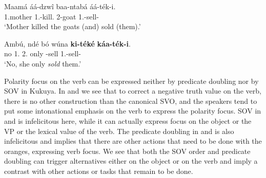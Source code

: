 \documentclass[output=paper,colorlinks,citecolor=brown,
]{langscibook}
\begin{document}
\begin{exe}
    \ex \label{57}
    \begin{xlist}
\ex
\label{57a}
\gll
Maamá áá-dzwî baa-ntabá áá-ték-i.\\
1.mother 1\Sm{}.\Pst{}-kill.\Pst{} 2-goat 1\Sm{}.\Pst{}-sell-\Pst{}\\
\trans ‘Mother killed the goats (and) sold (them).’

\ex
\label{57b}
\gll
Ambú, ndé bó wúna \textbf{ki-téké} \textbf{káa-ték-i}.\\
no 1.\Pro{} 2.\Pro{} only \Inf{}-sell 1\Sm{}.\Pst{}-sell-\Pst{}\\
\trans ‘No, she only \textit{sold} them.’

    \end{xlist}
\end{exe} 
Polarity focus on the verb can be expressed neither by predicate doubling nor by SOV in Kukuya. In  and  we see that to correct a negative truth value on the verb, there is no other construction than the canonical SVO, and the speakers tend to put some intonational emphasis on the verb to express the polarity focus. SOV in  and  is infelicitous here, while it can actually express focus on the object or the VP or the lexical value of the verb. The predicate doubling in  and  is also infelicitous and implies that there are other actions that need to be done with the oranges, expressing verb focus. We see that both the SOV order and predicate doubling can trigger alternatives either on the object or on the verb and imply a contrast with other actions or tasks that remain to be done.
\end{document}
